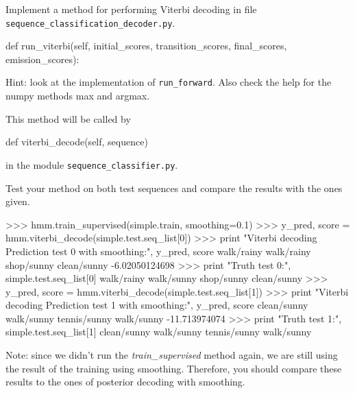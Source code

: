 \begin{exercise}
Implement a method 
for performing Viterbi decoding in 
file {\tt sequence\_classification\_decoder.py}.
\begin{python}
        def run_viterbi(self, initial_scores, transition_scores, final_scores, emission_scores):
\end{python}
Hint: look at the implementation of {\tt run\_forward}. Also check the help for the numpy methods max and argmax.

This method will be called 
by 
\begin{python}
def viterbi_decode(self, sequence)
\end{python}
in the module {\tt sequence\_classifier.py}.
%

Test your method on both test sequences and compare the results with
the ones given.
\begin{python}
>>> hmm.train_supervised(simple.train, smoothing=0.1)
>>> y_pred, score = hmm.viterbi_decode(simple.test.seq_list[0])
>>> print "Viterbi decoding Prediction test 0 with smoothing:", y_pred, score
walk/rainy walk/rainy shop/sunny clean/sunny  -6.02050124698
>>> print "Truth test 0:", simple.test.seq_list[0]
walk/rainy walk/sunny shop/sunny clean/sunny 
>>> y_pred, score = hmm.viterbi_decode(simple.test.seq_list[1])
>>> print "Viterbi decoding Prediction test 1 with 
smoothing:", y_pred, score
clean/sunny walk/sunny tennis/sunny walk/sunny  -11.713974074
>>> print "Truth test 1:", simple.test.seq_list[1]
clean/sunny walk/sunny tennis/sunny walk/sunny 
\end{python}

Note: since we didn't run the \emph{train\_supervised} method again, we are still using the result of the training using smoothing. Therefore, you should compare these results to the ones of posterior decoding with smoothing.

\end{exercise}




